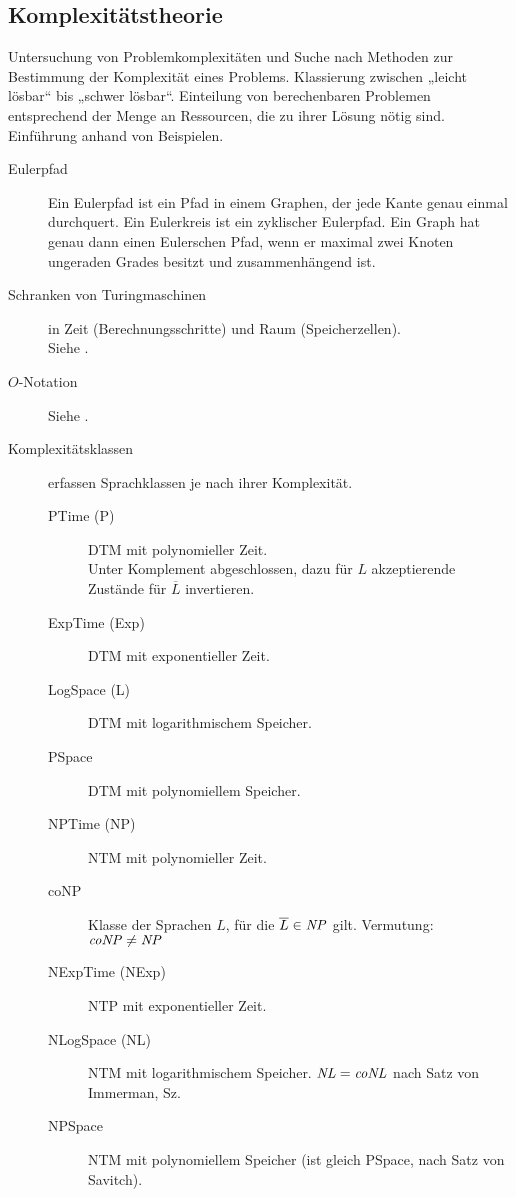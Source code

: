 \subsection{Komplexitätstheorie}
\label{subsec:komplex}
    Untersuchung von Problemkomplexitäten und Suche nach Methoden zur Bestimmung der Komplexität eines Problems. Klassierung zwischen „leicht lösbar“ bis „schwer lösbar“. Einteilung von berechenbaren Problemen entsprechend der Menge an Ressourcen, die zu ihrer Lösung nötig sind. Einführung anhand von Beispielen. 
    \begin{description}
        \item[Eulerpfad] Ein Eulerpfad ist ein Pfad in einem Graphen, der jede Kante genau einmal durchquert. Ein Eulerkreis ist ein zyklischer Eulerpfad. Ein Graph hat genau dann einen Eulerschen Pfad, wenn er maximal zwei Knoten ungeraden Grades besitzt und zusammenhängend ist. 

        \item[Schranken von Turingmaschinen] in Zeit (Berechnungsschritte) und Raum (Speicherzellen). \\ Siehe .
        \item[$O$-Notation] Siehe .

\newpage
        \item[Komplexitätsklassen] erfassen Sprachklassen je nach ihrer Komplexität. 
            \begin{description}
                \item[PTime (P)] DTM mit polynomieller Zeit. \\
                    Unter Komplement abgeschlossen, dazu für $L$ akzeptierende Zustände für $\overline{L}$ invertieren.
                \item[ExpTime (Exp)] DTM mit exponentieller Zeit.
                \item[LogSpace (L)] DTM mit logarithmischem Speicher.
                \item[PSpace] DTM mit polynomiellem Speicher. \\

                \item[NPTime (NP)] NTM mit polynomieller Zeit.
                \item[coNP] Klasse der Sprachen $L$, für die $\overline{L} \in \mathit{NP}$ gilt. Vermutung: $\mathit{coNP} \neq \mathit{NP}$
                \item[NExpTime (NExp)] NTP mit exponentieller Zeit.
                \item[NLogSpace (NL)] NTM mit logarithmischem Speicher. $\mathit{NL} = \mathit{coNL}$ nach Satz von Immerman, Sz.
                \item[NPSpace] NTM mit polynomiellem Speicher (ist gleich PSpace, nach Satz von Savitch).
            \end{description}


\end{description}
